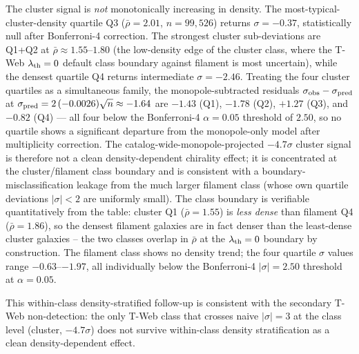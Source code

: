 \documentclass[aps,prd,twocolumn,superscriptaddress,showpacs,preprintnumbers,nofootinbib,longbibliography,floatfix]{revtex4-2}
\begin{document}
The cluster signal is \emph{not} monotonically increasing in density.
The most-typical-cluster-density quartile Q3 ($\bar\rho = 2.01$,
$n = 99{,}526$) returns $\sigma = -0.37$, statistically null after
Bonferroni-4 correction. The strongest cluster sub-deviations are
Q1+Q2 at $\bar\rho \approx 1.55$--$1.80$ (the low-density edge of
the cluster class, where the T-Web $\lambda_{\rm th} = 0$ default
class boundary against filament is most uncertain), while the densest
quartile Q4 returns intermediate $\sigma = -2.46$. Treating the four
cluster quartiles as a simultaneous family, the monopole-subtracted
residuals $\sigma_{\rm obs} - \sigma_{\rm pred}$ at
$\sigma_{\rm pred} = 2\,(-0.0026)\sqrt{n} \approx -1.64$ are $-1.43$
(Q1), $-1.78$ (Q2), $+1.27$ (Q3), and $-0.82$ (Q4) --- all four below
the Bonferroni-4 $\alpha = 0.05$ threshold of $2.50$, so no quartile
shows a significant departure from the monopole-only model after
multiplicity correction. The catalog-wide-monopole-projected
$-4.7\sigma$ cluster signal is therefore not a clean density-dependent
chirality effect; it is concentrated at the cluster/filament class
boundary and is consistent with a boundary-misclassification leakage
from the much larger filament class (whose own quartile deviations
$|\sigma| < 2$ are uniformly small). The class boundary is verifiable
quantitatively from the table: cluster Q1 ($\bar\rho = 1.55$) is
\emph{less dense} than filament Q4 ($\bar\rho = 1.86$), so the
densest filament galaxies are in fact denser than the least-dense
cluster galaxies -- the two classes overlap in $\bar\rho$ at the
$\lambda_{\rm th} = 0$ boundary by construction. The filament class shows no
density trend; the four quartile $\sigma$ values range
$-0.63$--$-1.97$, all individually below the Bonferroni-4 $|\sigma| =
2.50$ threshold at $\alpha = 0.05$.

This within-class density-stratified follow-up is consistent with the
secondary T-Web non-detection: the only T-Web class that
crosses naive $|\sigma| = 3$ at the class level (cluster, $-4.7\sigma$)
does not survive within-class density stratification as a clean
density-dependent effect.
\end{document}
